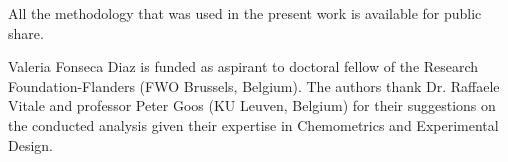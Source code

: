 \documentclass[journal=ancham,manuscript=article]{achemso}
\begin{document}
All the methodology that was used in the present work is available for public share. 


\begin{acknowledgement}

Valeria Fonseca Diaz is funded as aspirant to doctoral fellow of
the Research Foundation-Flanders (FWO Brussels, Belgium).
The authors thank Dr. Raffaele Vitale and professor Peter Goos (KU Leuven, Belgium) for their suggestions on the conducted analysis given their expertise in Chemometrics and Experimental Design. 
\end{acknowledgement}





\end{document}
